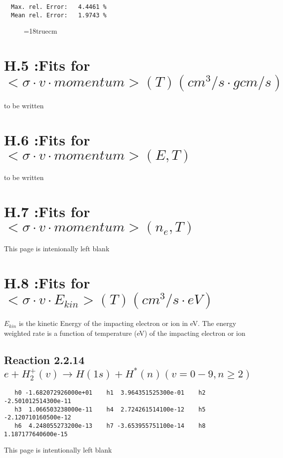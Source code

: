 \begin{verbatim}
  Max. rel. Error:   4.4461 %
  Mean rel. Error:   1.9743 %
\end{verbatim}
\begin{figure} \label{7.2.3b}
\epsfxsize=18truecm
\end{figure}
\newpage


\section{H.5 :Fits for $<\sigma \cdot v \cdot momentum> (T)  (cm^3/s
\cdot g cm/s)$}

to be written

\section{H.6 :Fits for $<\sigma \cdot v \cdot momentum> (E,T) $ }


to be written

\section{H.7 :Fits for $<\sigma \cdot v \cdot momentum> (n_e,T) $ }

\newpage
This page is intenionally left blank
\newpage

\section{H.8 :Fits for $<\sigma \cdot v \cdot E_{kin}> (T)  (cm^3/s
\cdot eV)$}

$E_{kin}$ is the kinetic Energy of the impacting electron or ion in eV.
The energy weighted rate is a function of temperature (eV) of the
impacting electron or ion

\subsection{
Reaction 2.2.14   $e + H_2^+(v) \rightarrow H(1s) + H^*(n)   (v=0-9, n \ge 2) $
}



\begin{verbatim}
   h0 -1.682072926000e+01    h1  3.964351525300e-01    h2 -2.501012514300e-11
   h3  1.066503238000e-11    h4  2.724261514100e-12    h5 -2.120710160500e-12
   h6  4.248055273200e-13    h7 -3.653955751100e-14    h8  1.187177640600e-15

\end{verbatim}
\newpage
This page is intentionally left blank
\newpage


